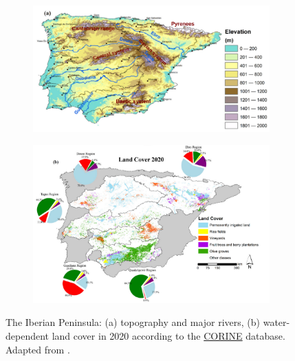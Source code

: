 \begin{figure}[hbtp]
    \centering
    \begin{subfigure}{0.8\textwidth}
        \includegraphics[width=\linewidth]{images/intro/ip_topography_fonseca_mountains.png}
    \end{subfigure}
    \begin{subfigure}{0.8\textwidth}
        \includegraphics[width=\linewidth]{images/intro/land_cover_fonseca.png}
    \end{subfigure}
    \caption{The Iberian Peninsula: (a) topography and major rivers, (b) water-dependent land cover in 2020 according to the \href{https://land.copernicus.eu/en/products/corine-land-cover}{CORINE} database. Adapted from \citet{fonseca_agricultural_2022}.}
    \label{fig:IP_map_fonseca}
\end{figure}

